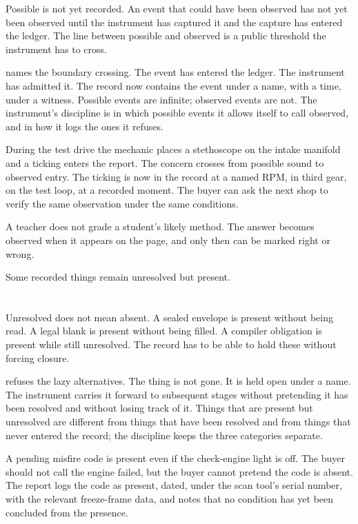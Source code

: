Possible is not yet recorded. An event that could have been observed has
not yet been observed until the instrument has captured it and the
capture has entered the ledger. The line between possible and observed is
a public threshold the instrument has to cross.

 names the boundary crossing. The event has entered the
ledger. The instrument has admitted it. The record now contains the event
under a name, with a time, under a witness. Possible events are
infinite; observed events are not. The instrument's discipline is in
which possible events it allows itself to call observed, and in how it
logs the ones it refuses.

During the test drive the mechanic places a stethoscope on the intake
manifold and a ticking enters the report. The concern crosses from
possible sound to observed entry. The ticking is now in the record at a
named RPM, in third gear, on the test loop, at a recorded moment. The
buyer can ask the next shop to verify the same observation under the
same conditions.

A teacher does not grade a student's likely method. The answer becomes
observed when it appears on the page, and only then can be marked right
or wrong.

Some recorded things remain unresolved but present.

\section{}
\label{se:present}

Unresolved does not mean absent. A sealed envelope is present without
being read. A legal blank is present without being filled. A compiler
obligation is present while still unresolved. The record has to be able
to hold these without forcing closure.

 refuses the lazy alternatives. The thing is not gone. It
is held open under a name. The instrument carries it forward to
subsequent stages without pretending it has been resolved and without
losing track of it. Things that are present but unresolved are different
from things that have been resolved and from things that never entered
the record; the discipline keeps the three categories separate.

A pending misfire code is present even if the check-engine light is off.
The buyer should not call the engine failed, but the buyer cannot pretend
the code is absent. The report logs the code as present, dated, under the
scan tool's serial number, with the relevant freeze-frame data, and notes
that no condition has yet been concluded from the presence.

